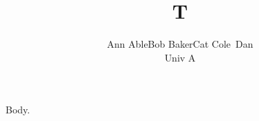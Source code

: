 \documentclass{article}
\begin{document}
\title{T}
\author{Ann Able\hfill Bob Baker\hspace{3em}Cat Cole\footnotemark\ Dan\\[2ex] Univ A}
\maketitle
{}
Body.
\end{document}
